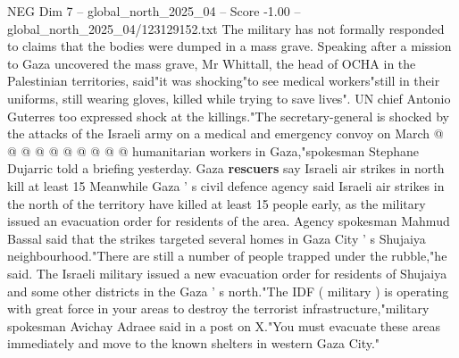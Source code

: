 \begin{textsample}{NEG Dim 7 – global\_north\_2025\_04 – Score -1.00 – global\_north\_2025\_04/123129152.txt}
The military has not formally responded to claims that the bodies were dumped in a mass grave.
Speaking after a mission to Gaza uncovered the mass grave, Mr Whittall, the head of OCHA in the Palestinian territories, said"it was shocking"to see medical workers"still in their uniforms, still wearing gloves, killed while trying to save lives".
UN chief Antonio Guterres too expressed shock at the killings."The secretary-general is shocked by the attacks of the Israeli army on a medical and emergency convoy on March @ @ @ @ @ @ @ @ @ @ humanitarian workers in Gaza,"spokesman Stephane Dujarric told a briefing yesterday.
Gaza \textbf{rescuers} say Israeli air strikes in north kill at least 15 Meanwhile Gaza ' s civil defence agency said Israeli air strikes in the north of the territory have killed at least 15 people early, as the military issued an evacuation order for residents of the area.
Agency spokesman Mahmud Bassal said that the strikes targeted several homes in Gaza City ' s Shujaiya neighbourhood."There are still a number of people trapped under the rubble,"he said.
The Israeli military issued a new evacuation order for residents of Shujaiya and some other districts in the Gaza ' s north."The IDF ( military ) is operating with great force in your areas to destroy the terrorist infrastructure,"military spokesman Avichay Adraee said in a post on X."You must evacuate these areas immediately and move to the known shelters in western Gaza City."

\end{textsample}
